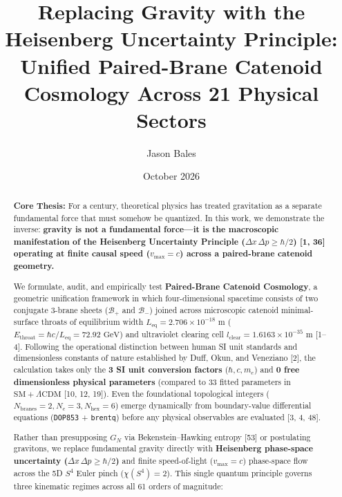 \documentclass[10pt,a4paper]{article}
\title{\textbf{Replacing Gravity with the Heisenberg Uncertainty Principle: Unified Paired-Brane Catenoid Cosmology Across 21 Physical Sectors}}
\author{Jason Bales}
\date{October 2026}
\begin{document}
\maketitle
\begin{abstract}
\textbf{Core Thesis:} For a century, theoretical physics has treated gravitation as a separate fundamental force that must somehow be quantized. In this work, we demonstrate the inverse: \textbf{gravity is not a fundamental force—it is the macroscopic manifestation of the Heisenberg Uncertainty Principle ($\Delta x\,\Delta p \ge \hbar/2$) [1, 36] operating at finite causal speed ($v_{\max} = c$) across a paired-brane catenoid geometry.}

We formulate, audit, and empirically test \textbf{Paired-Brane Catenoid Cosmology}, a geometric unification framework in which four-dimensional spacetime consists of two conjugate 3-brane sheets ($\mathcal{B}_+$ and $\mathcal{B}_-$) joined across microscopic catenoid minimal-surface throats of equilibrium width $L_{\text{eq}} = 2.706 \times 10^{-18}\text{ m}$ ($E_{\text{throat}} = \hbar c / L_{\text{eq}} = 72.92\text{ GeV}$) and ultraviolet clearing cell $l_{\text{clear}} = 1.6163 \times 10^{-35}\text{ m}$ [1–4]. Following the operational distinction between human SI unit standards and dimensionless constants of nature established by Duff, Okun, and Veneziano [2], the calculation takes only the \textbf{3 SI unit conversion factors} ($\hbar, c, m_e$) and \textbf{0 free dimensionless physical parameters} (compared to 33 fitted parameters in $\text{SM} + \Lambda\text{CDM}$ [10, 12, 19]). Even the foundational topological integers ($N_{\text{branes}}=2, N_c=3, N_{\text{hex}}=6$) emerge dynamically from boundary-value differential equations (\texttt{DOP853} + \texttt{brentq}) before any physical observables are evaluated [3, 4, 48].

Rather than presupposing $G_N$ via Bekenstein–Hawking entropy [53] or postulating gravitons, we replace fundamental gravity directly with \textbf{Heisenberg phase-space uncertainty ($\Delta x\,\Delta p \ge \hbar/2$)} and finite speed-of-light ($v_{\max}=c$) phase-space flow across the 5D $S^4$ Euler pinch ($\chi(S^4)=2$). This single quantum principle governs three kinematic regimes across all 61 orders of magnitude:


\end{abstract}
\end{document}
